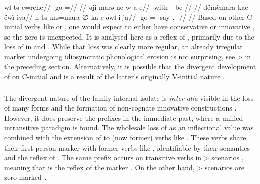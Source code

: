 \carijo \parencite[][5, 42, personal communication]{guerrero2016karihona}
\begingl
\gla wɨ-tə-e=rehe//
\glb {}-go-=//
\glft {}//
\endgl
{}
\begingl
\gla əji-marə-ne w-a-e//
\glb {}-with- -be-//
\glft {}//
\endgl
{}
\begingl
\glpreamble dëmëmara kae ëwï iya//
\gla n-tə-mə=mara ∅-ka-e əwɨ i-ja//
\glb {}-go-= -say-.  -//
\glft {}//
\endgl
\xe
Based on other C-initial verbs like   or  , one would expect   to either have conservative  or innovative , so the zero is unexpected.
It is analysed here as a reflex of , primarily due to the loss of  in \ikpeng and \hixka.
While that loss was clearly more regular, an already irregular marker undergoing idiosyncratic phonological erosion is not surprising, see \akuriyo {} >  in the preceding section.
Alternatively, it is possible that the divergent development of  on C-initial   and   is a result of the latter's originally V-initial nature .

\subsubsection{\yukpa {}}
\label{sec:yukpa}
The divergent nature of the family-internal isolate \yukpa is \textit{inter alia} visible in the loss of many \setone forms and the formation of non-cognate innovative constructions \parencite{meira2006syntactic}.
However, it does preserve the \setone prefixes in the immediate past, where a unified intransitive paradigm  is found.
The wholesale loss of  as an inflectional value was combined with the extension of   to (now former)  verbs like  .
%
%
%
These verbs share their first person marker  with former  verbs like  , identifiable by their semantics and the reflex of \detrz.
The same prefix occurs on transitive verbs in > scenarios , meaning that  is the reflex of the \PC {} marker .
On the other hand, > scenarios are zero-marked .

